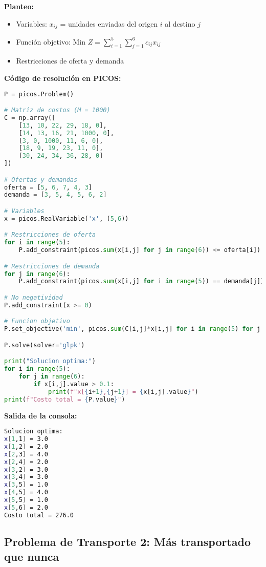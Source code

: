 \documentclass[12pt]{article}
\begin{document}
\textbf{Planteo:}
\begin{itemize}
\item Variables: $x_{ij}$ = unidades enviadas del origen $i$ al destino $j$
\item Función objetivo: Min $Z = \sum_{i=1}^5 \sum_{j=1}^6 c_{ij}x_{ij}$
\item Restricciones de oferta y demanda
\end{itemize}

\textbf{Código de resolución en PICOS:}
\begin{lstlisting}[language=Python]
P = picos.Problem()

# Matriz de costos (M = 1000)
C = np.array([
    [13, 10, 22, 29, 18, 0],
    [14, 13, 16, 21, 1000, 0],
    [3, 0, 1000, 11, 6, 0],
    [18, 9, 19, 23, 11, 0],
    [30, 24, 34, 36, 28, 0]
])

# Ofertas y demandas
oferta = [5, 6, 7, 4, 3]
demanda = [3, 5, 4, 5, 6, 2]

# Variables
x = picos.RealVariable('x', (5,6))

# Restricciones de oferta
for i in range(5):
    P.add_constraint(picos.sum(x[i,j] for j in range(6)) <= oferta[i])

# Restricciones de demanda
for j in range(6):
    P.add_constraint(picos.sum(x[i,j] for i in range(5)) == demanda[j])

# No negatividad
P.add_constraint(x >= 0)

# Funcion objetivo
P.set_objective('min', picos.sum(C[i,j]*x[i,j] for i in range(5) for j in range(6)))

P.solve(solver='glpk')

print("Solucion optima:")
for i in range(5):
    for j in range(6):
        if x[i,j].value > 0.1:
            print(f"x[{i+1},{j+1}] = {x[i,j].value}")
print(f"Costo total = {P.value}")
\end{lstlisting}

\textbf{Salida de la consola:}
\begin{lstlisting}[language=bash,backgroundcolor=\color{black},basicstyle=\color{white}\ttfamily,numbers=none]
Solucion optima:
x[1,1] = 3.0
x[1,2] = 2.0
x[2,3] = 4.0
x[2,4] = 2.0
x[3,2] = 3.0
x[3,4] = 3.0
x[3,5] = 1.0
x[4,5] = 4.0
x[5,5] = 1.0
x[5,6] = 2.0
Costo total = 276.0
\end{lstlisting}

\subsection{Problema de Transporte 2: Más transportado que nunca}
\end{document}
